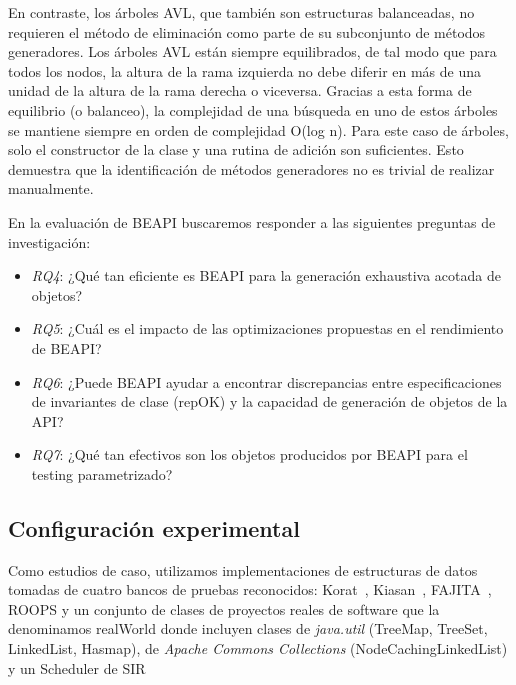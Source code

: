 En contraste, los árboles AVL,
que también son estructuras balanceadas, no requieren el método de eliminación como parte de su subconjunto de métodos generadores.
Los árboles AVL están siempre equilibrados, 
de tal modo que para todos los nodos, la altura de la rama izquierda no debe diferir en más de una unidad de la altura de la rama derecha o viceversa. 
Gracias a esta forma de equilibrio (o balanceo), la complejidad de una búsqueda en uno de estos árboles se mantiene siempre en orden de complejidad O(log n). 
Para este caso de árboles, solo el constructor de la clase y una rutina de adición son suficientes. 
Esto demuestra que la identificación de métodos generadores no es trivial de realizar manualmente.




En la evaluación de BEAPI buscaremos responder a las siguientes preguntas de
investigación:

\begin{itemize}
\item \emph{RQ4}: ¿Qué tan eficiente es BEAPI para la generación exhaustiva                                                                                       
    acotada de objetos?
\item\emph{RQ5}: ¿Cuál es el impacto de las optimizaciones propuestas en el
    rendimiento de BEAPI?
\item\emph{RQ6}: ¿Puede BEAPI ayudar a encontrar discrepancias entre
    especificaciones de invariantes de clase (repOK) y la capacidad de generación de objetos de la API?
\item\emph{RQ7}: ¿Qué tan efectivos son los objetos producidos por BEAPI para el
    testing parametrizado?  
\end{itemize}

\subsection{Configuración experimental}

Como estudios de caso, utilizamos implementaciones de estructuras de datos tomadas de cuatro bancos 
de pruebas reconocidos: \textsf{Korat}~\cite{Boyapati02}, \textsf{Kiasan}~\cite{Deng06}, 
\textsf{FAJITA}~\cite{Abad13}, \textsf{ROOPS} y un conjunto de clases de proyectos reales de software que la denominamos \textsf{realWorld}
donde incluyen clases de \emph{java.util} (TreeMap, TreeSet, LinkedList, Hasmap), de \emph{Apache Commons Collections} (NodeCachingLinkedList) y un Scheduler de SIR

